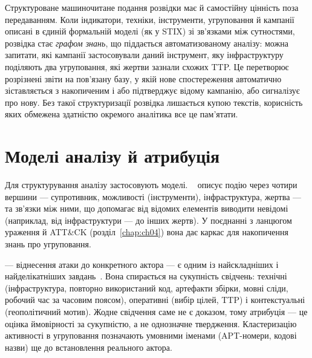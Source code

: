 Структуроване машиночитане подання розвідки має й самостійну цінність поза передаванням. Коли індикатори, техніки, інструменти, угруповання й кампанії описані в єдиній формальній моделі (як у STIX) зі зв'язками між сутностями, розвідка стає \emph{графом знань}, що піддається автоматизованому аналізу: можна запитати, які кампанії застосовували даний інструмент, яку інфраструктуру поділяють два угруповання, які жертви зазнали схожих TTP. Це перетворює розрізнені звіти на пов'язану базу, у якій нове спостереження автоматично зіставляється з накопиченим і або підтверджує відому кампанію, або сигналізує про нову. Без такої структуризації розвідка лишається купою текстів, корисність яких обмежена здатністю окремого аналітика все це пам'ятати.

\section{Моделі аналізу й атрибуція}\label{sec:ch12-attribution}

Для структурування аналізу застосовують моделі. ~\cite{ch12:diamond} описує подію через чотири вершини --- супротивник, можливості (інструменти), інфраструктура, жертва --- та зв'язки між ними, що допомагає від відомих елементів виводити невідомі (наприклад, від інфраструктури --- до інших жертв). У поєднанні з ланцюгом ураження й ATT\&CK (розділ~\ref{chap:ch04}) вона дає каркас для накопичення знань про угруповання.

\begin{tikzfig}
\end{tikzfig}

 --- віднесення атаки до конкретного актора --- є одним із найскладніших і найделікатніших завдань~\cite{ch12:rid}. Вона спирається на сукупність свідчень: технічні (інфраструктура, повторно використаний код, артефакти збірки, мовні сліди, робочий час за часовим поясом), оперативні (вибір цілей, TTP) і контекстуальні (геополітичний мотив). Жодне свідчення саме не є доказом, тому атрибуція --- це оцінка ймовірності за сукупністю, а не однозначне твердження. Кластеризацію активності в угруповання позначають умовними іменами (APT-номери, кодові назви) ще до встановлення реального актора.

